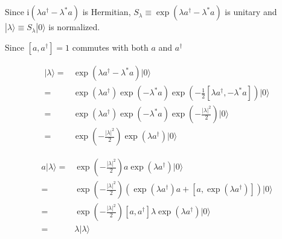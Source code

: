 \documentclass[10pt,fleqn]{article}
\newcommand{\ui}{\mathrm{i}}
\newcommand{\eqar}[1]
{
  \begin{align*}
    #1
  \end{align*}
}
\newcommand{\paren}[1]{{\left({#1}\right)}}
\newcommand{\abs}[1]{{\left|{#1}\right|}}
\newcommand{\sqr}[1]{{\left[{#1}\right]}}
\begin{document}
\section{}
\subsection{}
Since $\ui\paren{\lambda a^\dagger-\lambda^*a}$ is Hermitian,
$S_\lambda\equiv\exp\paren{\lambda a^\dagger-\lambda^*a}$ is unitary
and $|\lambda\rangle\equiv S_\lambda|0\rangle$ is normalized.

Since $[a, a^\dagger]=1$ commutes with both $a$ and $a^\dagger$
\eqar{
  |\lambda\rangle=&\exp\paren{\lambda a^\dagger-\lambda^*a}|0\rangle\\
  =&\exp\paren{\lambda a^\dagger}\exp\paren{-\lambda^*a}\exp\paren{-\frac12\sqr{\lambda a^\dagger,-\lambda^*a}}|0\rangle\\
  =&\exp\paren{\lambda a^\dagger}\exp\paren{-\lambda^*a}\exp\paren{-\frac{\abs{\lambda}^2}2}|0\rangle\\
  =&\exp\paren{-\frac{\abs{\lambda}^2}2}\exp\paren{\lambda a^\dagger}|0\rangle
}
\eqar{
  a|\lambda\rangle=&\exp\paren{-\frac{\abs{\lambda}^2}2}a\exp\paren{\lambda a^\dagger}|0\rangle\\
  =&\exp\paren{-\frac{\abs{\lambda}^2}2}\paren{\exp\paren{\lambda a^\dagger}a+\sqr{a,\exp\paren{\lambda a^\dagger}}}|0\rangle\\
  =&\exp\paren{-\frac{\abs{\lambda}^2}2}\sqr{a,a^\dagger}\lambda\exp\paren{\lambda a^\dagger}|0\rangle\\
  =&\lambda|\lambda\rangle
}
\end{document}
